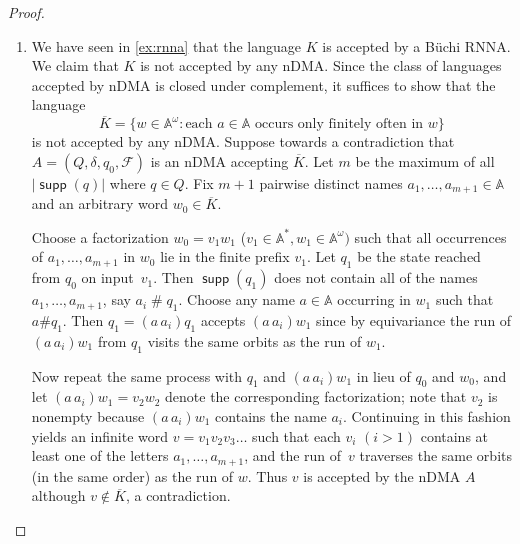 \documentclass[10pt,a4paper]{amsart}
\newcommand{\compr}{:}
\newcommand{\F}{\mathcal{F}}
\numberwithin{equation}{section}
\newcommand{\ol}{\overline}
\newcommand{\+}[1]{\mathcal{#1}\xspace}
\newcommand{\names}{\mathbb{A}}
\DeclareMathOperator{\supp}{\mathsf{supp}} %
\newcommand{\fresh}{\mathbin{\#}}
\theoremstyle{definition}
\begin{document}
\begin{proof}
  \begin{enumerate}
  \item We have seen in \autoref{ex:rnna} that the language $K$ is
    accepted by a Büchi RNNA. We claim that $K$ is not accepted by any
    nDMA. Since the class of languages accepted by nDMA is closed
    under complement, it suffices to show that the
    language
    \[\ol{K}=\{ w\in \names^\omega\compr \text{each $a\in \names$ occurs
        only finitely often in $w$} \}\] is not accepted by any
    nDMA. Suppose towards a contradiction that $A=(Q,\delta,q_0,\F)$ is an
    nDMA accepting $\ol{K}$. Let $m$ be the maximum of all
    $|\supp(q)|$ where $q\in Q$.  Fix $m+1$ pairwise distinct names
    $a_1,\ldots, a_{m+1}\in \names$ and an arbitrary word
    $w_0\in \ol{K}$.

    Choose a factorization $w_0=v_1w_1$
    ($v_1\in \names^*, w_1\in \names^\omega)$ such that all
    occurrences of $a_1,\ldots, a_{m+1}$ in $w_0$ lie in the finite
    prefix $v_1$. Let $q_1$ be the state reached from $q_0$ on
    input~$v_1$.  Then $\supp(q_1)$ does not contain all of the names
    $a_1,\ldots, a_{m+1}$, say $a_i\fresh q_1$. Choose any name
    $a\in \names$ occurring in $w_1$ such that $a\# q_1$. Then
    $q_1=(a\, a_i)q_1$ accepts $(a\, a_i)w_1$ since by
    equivariance the run of $(a\, a_i)w_1$ from $q_1$ visits the
    same orbits as the run of $w_1$.

    Now repeat the same process with $q_1$ and $(a\,a_i)w_1$ in lieu
    of $q_0$ and $w_0$, and let \mbox{$(a\, a_i)w_1 = v_2w_2$} denote the
    corresponding factorization; note that $v_2$ is nonempty because
    $(a\,a_i)w_1$ contains the name $a_i$. Continuing in this fashion
    yields an infinite word $v=v_1v_2v_3\ldots$ such that each $v_i$
    $(i>1)$ contains at least one of the letters
    $a_1,\ldots, a_{m+1}$, and the run of~$v$ traverses the same
    orbits (in the same order) as the run of $w$. Thus $v$ is accepted
    by the nDMA $A$ although $v\not\in \ol{K}$, a contradiction.
    

\end{enumerate}
\end{proof}
\end{document}
